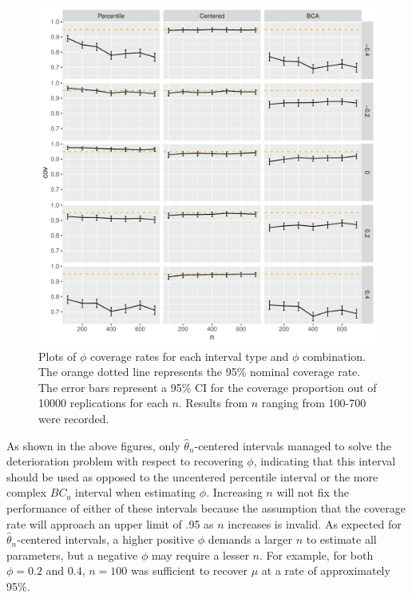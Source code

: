 \documentclass[12pt, letterpaper, titlepage]{article}
\begin{document}
\begin{figure}[tbp]
  \centering
  \includegraphics[width=\textwidth]{figures/plot_phi}
  \caption{Plots of $\phi$ coverage rates for each interval type and $\phi$
    combination. The orange dotted line represents the 95\% nominal coverage
    rate. The error bars represent a 95\% CI for the coverage
    proportion out of 10000 replications for each $n$. Results from $n$
    ranging from 100-700 were recorded.}
  \label{fig:phi}
\end{figure}


As shown in the above figures, only $\hat{\theta}_{n}$-centered intervals
managed to solve the deterioration problem with respect to recovering $\phi$,
indicating that this interval should be used as opposed to the uncentered
percentile interval or the more complex $BC_a$ interval when estimating
$\phi$. Increasing $n$ will not fix the performance of either of these
intervals because the assumption that the coverage rate will approach an upper
limit of .95 as $n$ increases is invalid. As expected for
$\hat{\theta}_{n}$-centered intervals, a higher positive $\phi$ demands a
larger $n$ to estimate all parameters, but a negative $\phi$ may require a
lesser $n$. For example, for both $\phi = 0.2$ and $0.4$, $n = 100$ was
sufficient to recover $\mu$ at a rate of approximately 95\%.
\end{document}
